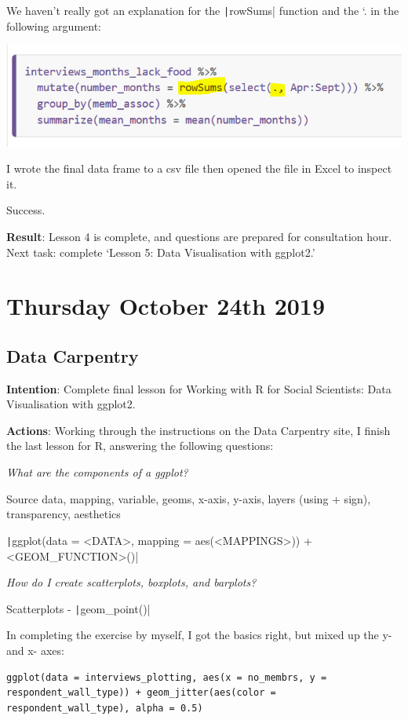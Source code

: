 \documentclass{article}
\begin{document}
{\item We haven’t really got an explanation for the \texttt|rowSums| function and the `. in the following argument:

\includegraphics[width=1.0\textwidth]{rstudio_25.PNG}
\item I wrote the final data frame to a csv file then opened the file in Excel to inspect it. \item Success.}
\textbf{Result}: Lesson 4 is complete, and questions are prepared for consultation hour. Next task: complete ‘Lesson 5: Data Visualisation with ggplot2.’

\section{Thursday October 24th 2019}

\subsection{Data Carpentry}

\textbf{Intention}: Complete final lesson for Working with R for Social Scientists: Data Visualisation with ggplot2.

\textbf{Actions}: Working through the instructions on the Data Carpentry site, I finish the last lesson for R, answering the following questions:

\textit{What are the components of a ggplot?}

Source data, mapping, variable, geoms, x-axis, y-axis, layers (using + sign), transparency, aesthetics

\texttt|ggplot(data = <DATA>, mapping = aes(<MAPPINGS>)) +  <GEOM_FUNCTION>()|

\textit{How do I create scatterplots, boxplots, and barplots?}

Scatterplots - \texttt|geom_point()|

In completing the exercise by myself, I got the basics right, but mixed up the y- and x- axes:

\begin{verbatim}
ggplot(data = interviews_plotting, aes(x = no_membrs, y = respondent_wall_type)) + geom_jitter(aes(color = respondent_wall_type), alpha = 0.5)
\end{verbatim}
\end{document}
